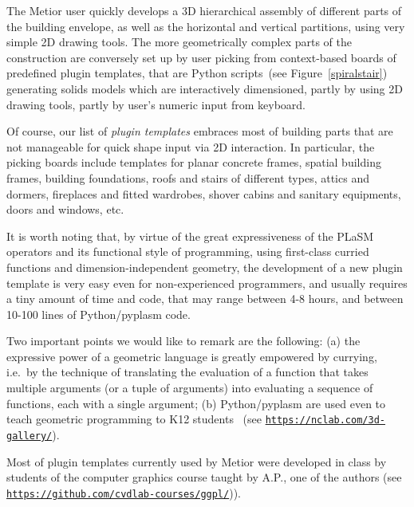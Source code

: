 The Metior user quickly develops a 3D hierarchical assembly of different parts of the building envelope, as well as the horizontal and vertical partitions, using very simple 2D drawing tools. The more geometrically complex parts of the construction are conversely set up by user picking from context-based boards of predefined plugin templates, that are Python scripts~(see Figure~\ref{spiralstair}) generating solids models which are interactively dimensioned, partly by using 2D drawing tools, partly by user's numeric input from keyboard. 

Of course, our list of \emph{plugin templates} embraces most of building parts that are not manageable for quick shape input via 2D interaction. In particular, the picking boards include templates for planar concrete frames, spatial building frames, building foundations, roofs and stairs of different types, attics and dormers, fireplaces and fitted wardrobes, shover cabins and sanitary equipments, doors and windows, etc.

It is worth noting that, by virtue of the great expressiveness of the PLaSM operators and its functional style of programming, using first-class curried functions and dimension-independent geometry, the development of a new plugin template is very easy even for non-experienced programmers, and usually requires a tiny amount of time and code, that may range between 4-8 hours, and between 10-100 lines of Python/pyplasm code. 

Two important points we would like to remark are the following: (a) the expressive power of a geometric language is greatly empowered by  currying, i.e.~by the technique of translating the evaluation of a function that takes multiple arguments (or a tuple of arguments) into evaluating a sequence of functions, each with a single argument; (b) Python/pyplasm are used even to teach geometric programming to K12 students~\cite{ncLab} (see \href{https://nclab.com/3d-gallery/}{\texttt{https://nclab.com/3d-gallery/}}). 

Most of plugin templates currently used by Metior were developed in class by students of the computer  graphics course taught by A.P., one of the authors (see \href{https://github.com/cvdlab-courses/ggpl/blob/master/slides.md}{\texttt{https://github.com/cvdlab-courses/ggpl/}})). 


